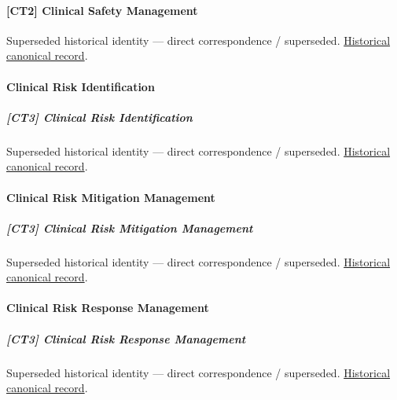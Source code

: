 \paragraph{[CT2] Clinical Safety Management}

\par\label{element:650ccec030fa46cc8c9d6b508a841778}
Superseded historical identity — direct correspondence / superseded. \href{../../../../continuum/strategy/capability/650ccec030fa46cc8c9d6b508a841778.md}{Historical canonical record}.\par

\paragraph{Clinical Risk Identification}

\subparagraph{[CT3] Clinical Risk Identification}

\par\label{element:690da55f1f5b4c44ba58cf67a717a564}
Superseded historical identity — direct correspondence / superseded. \href{../../../../continuum/strategy/capability/690da55f1f5b4c44ba58cf67a717a564.md}{Historical canonical record}.\par

\paragraph{Clinical Risk Mitigation Management}

\subparagraph{[CT3] Clinical Risk Mitigation Management}

\par\label{element:0bd3311d89af45bb935fde20e719369c}
Superseded historical identity — direct correspondence / superseded. \href{../../../../continuum/strategy/capability/0bd3311d89af45bb935fde20e719369c.md}{Historical canonical record}.\par

\paragraph{Clinical Risk Response Management}

\subparagraph{[CT3] Clinical Risk Response Management}

\par\label{element:20f719ab4b6741b393ef570b4d1b05df}
Superseded historical identity — direct correspondence / superseded. \href{../../../../continuum/strategy/capability/20f719ab4b6741b393ef570b4d1b05df.md}{Historical canonical record}.\par

